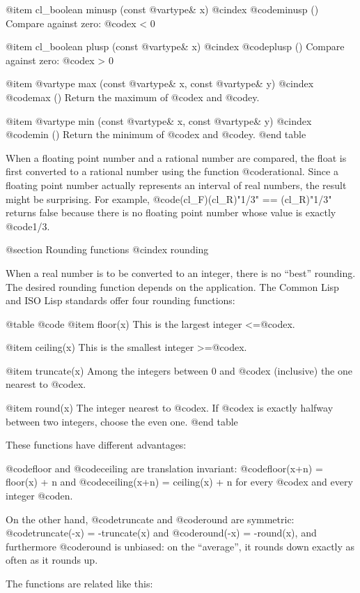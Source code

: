 @item cl_boolean minusp (const @var{type}& x)
@cindex @code{minusp ()}
Compare against zero: @code{x < 0}

@item cl_boolean plusp (const @var{type}& x)
@cindex @code{plusp ()}
Compare against zero: @code{x > 0}

@item @var{type} max (const @var{type}& x, const @var{type}& y)
@cindex @code{max ()}
Return the maximum of @code{x} and @code{y}.

@item @var{type} min (const @var{type}& x, const @var{type}& y)
@cindex @code{min ()}
Return the minimum of @code{x} and @code{y}.
@end table

When a floating point number and a rational number are compared, the float
is first converted to a rational number using the function @code{rational}.
Since a floating point number actually represents an interval of real numbers,
the result might be surprising.
For example, @code{(cl_F)(cl_R)"1/3" == (cl_R)"1/3"} returns false because
there is no floating point number whose value is exactly @code{1/3}.


@section Rounding functions
@cindex rounding

When a real number is to be converted to an integer, there is no ``best''
rounding. The desired rounding function depends on the application.
The Common Lisp and ISO Lisp standards offer four rounding functions:

@table @code
@item floor(x)
This is the largest integer <=@code{x}.

@item ceiling(x)
This is the smallest integer >=@code{x}.

@item truncate(x)
Among the integers between 0 and @code{x} (inclusive) the one nearest to @code{x}.

@item round(x)
The integer nearest to @code{x}. If @code{x} is exactly halfway between two
integers, choose the even one.
@end table

These functions have different advantages:

@code{floor} and @code{ceiling} are translation invariant:
@code{floor(x+n) = floor(x) + n} and @code{ceiling(x+n) = ceiling(x) + n}
for every @code{x} and every integer @code{n}.

On the other hand, @code{truncate} and @code{round} are symmetric:
@code{truncate(-x) = -truncate(x)} and @code{round(-x) = -round(x)},
and furthermore @code{round} is unbiased: on the ``average'', it rounds
down exactly as often as it rounds up.

The functions are related like this:

